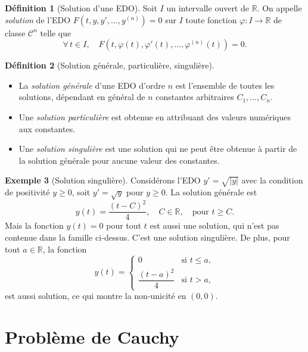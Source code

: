\documentclass[12pt,a4paper,openany]{book}
\theoremstyle{definition}
\newtheorem{definition}{Définition}[chapter]
\newtheorem{exemple}[definition]{Exemple}
\theoremstyle{plain}
\theoremstyle{remark}
\newcommand{\R}{\mathbb{R}}
\newcommand{\abs}[1]{\left|#1\right|}
\begin{document}
\begin{definition}[Solution d'une EDO]
\label{def:solution}
Soit $I$ un intervalle ouvert de $\R$. On appelle \emph{solution} de l'EDO $F(t,y,y',\ldots,y^{(n)}) = 0$ sur $I$ toute fonction $\varphi : I \to \R$ de classe $\mathscr{C}^n$ telle que
\[
\forall\, t \in I, \quad F\!\left(t, \varphi(t), \varphi'(t), \ldots, \varphi^{(n)}(t)\right) = 0.
\]
\end{definition}

\begin{definition}[Solution générale, particulière, singulière]
\label{def:solutions-types}
\begin{itemize}[leftmargin=*]
\item La \emph{solution générale} d'une EDO d'ordre $n$ est l'ensemble de toutes les solutions, dépendant en général de $n$ constantes arbitraires $C_1, \ldots, C_n$.
\item Une \emph{solution particulière} est obtenue en attribuant des valeurs numériques aux constantes.
\item Une \emph{solution singulière} est une solution qui ne peut être obtenue à partir de la solution générale pour aucune valeur des constantes.
\end{itemize}
\end{definition}

\begin{exemple}[Solution singulière]
\label{ex:solution-singuliere}
Considérons l'EDO $y' = \sqrt{\abs{y}}$ avec la condition de positivité $y \geq 0$, soit $y' = \sqrt{y}$ pour $y \geq 0$. La solution générale est
\[
y(t) = \frac{(t - C)^2}{4}, \quad C \in \R, \quad \text{pour } t \geq C.
\]
Mais la fonction $y(t) = 0$ pour tout $t$ est aussi une solution, qui n'est pas contenue dans la famille ci-dessus. C'est une solution singulière. De plus, pour tout $a \in \R$, la fonction
\[
y(t) = \begin{cases} 0 & \text{si } t \leq a, \\ \dfrac{(t-a)^2}{4} & \text{si } t > a, \end{cases}
\]
est aussi solution, ce qui montre la non-unicité en $(0,0)$.
\end{exemple}

\section{Problème de Cauchy}
\label{sec:probleme-cauchy}
\end{document}
